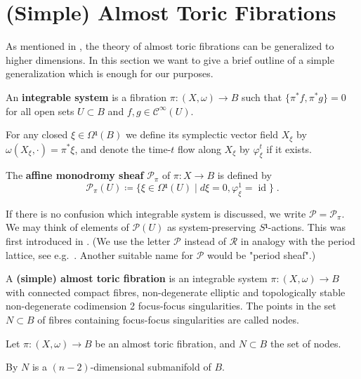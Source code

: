 \documentclass[12pt,a4paper,abstract=true,draft]{scrartcl}
\DeclareMathOperator{\id}{id}
\begin{document}
\section{(Simple) Almost Toric Fibrations}
\label{sec:general_atfs}

As mentioned in \cite{symington2002FourDF,evans2021atfs}, the theory of almost toric fibrations can be generalized to higher dimensions.
In this section we want to give a brief outline of a simple generalization which is enough for our purposes.

\begin{definition}
  An \textbf{integrable system} is a fibration $π\colon (X,ω) → B$ such that $\{π^*f,π^*g \} = 0$ for all open sets $U ⊂ B$ and $f,g ∈ 𝒞^∞(U)$.
\end{definition}

\begin{definition}
  For any closed $ξ ∈ Ω¹(B)$ we define its symplectic vector field $X_ξ$ by $ω(X_ξ, ·) = π^* ξ$, and denote the time-$t$ flow along $X_ξ$ by $φ_ξ^t$ if it exists.
\end{definition}

\begin{definition}
  The \textbf{affine monodromy sheaf} $𝒫_π$ of $π \colon X → B$ is defined by
  \[𝒫_π(U) ≔ \{ ξ ∈ Ω¹(U) \mid dξ=0, φ^1_ξ = \id\} \; .\]
\end{definition}

If there is no confusion which integrable system is discussed, we write $𝒫 = 𝒫_π$.
We may think of elements of $𝒫(U)$ as system-preserving $S¹$-actions.
This was first introduced in \cite[§3.3]{Zun03}.
(We use the letter $𝒫$ instead of $ℛ$ in analogy with the period lattice, see e.g.\ \cite[Section 1.4]{evans2021atfs}.
Another suitable name for $𝒫$ would be "period sheaf".)

\begin{definition}
  A \textbf{(simple) almost toric fibration} is an integrable system $π\colon (X,ω) → B$ with connected compact fibres, non-degenerate elliptic and topologically stable non-degenerate codimension 2 focus-focus singularities.
  The points in the set $N ⊂ B$ of fibres containing focus-focus singularities are called nodes.
\end{definition}

Let $π \colon (X,ω) → B$ be an almost toric fibration, and $N ⊂ B$ the set of nodes.

\begin{remark}
  By \cite[Proposition 5.4 b)]{Zun96} $N$ is a $(n-2)$-dimensional submanifold of $B$.
\end{remark}
\end{document}
